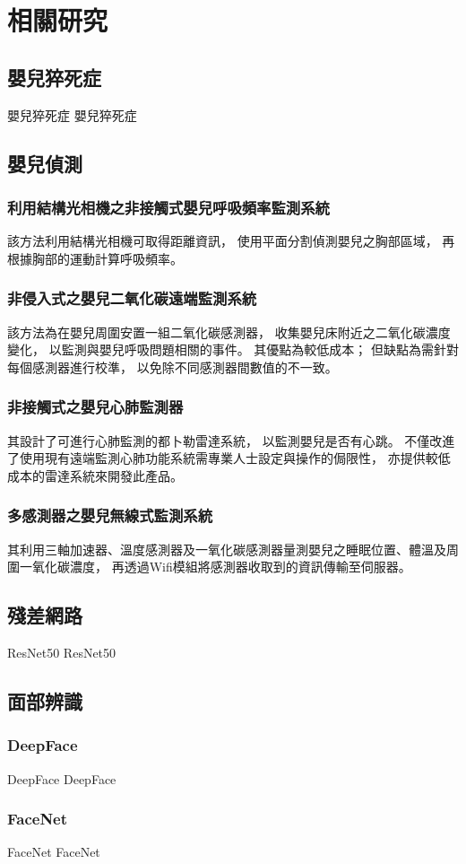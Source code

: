 \documentclass[class=NCU_thesis, crop=false]{standalone}
\begin{document}
\chapter{相關研究}

\section{嬰兒猝死症}
嬰兒猝死症 嬰兒猝死症

\section{嬰兒偵測}
\subsection{利用結構光相機之非接觸式嬰兒呼吸頻率監測系統}
該方法利用結構光相機可取得距離資訊，
使用平面分割偵測嬰兒之胸部區域，
再根據胸部的運動計算呼吸頻率。

\subsection{非侵入式之嬰兒二氧化碳遠端監測系統}
該方法為在嬰兒周圍安置一組二氧化碳感測器，
收集嬰兒床附近之二氧化碳濃度變化，
以監測與嬰兒呼吸問題相關的事件。
其優點為較低成本；
但缺點為需針對每個感測器進行校準，
以免除不同感測器間數值的不一致。

\subsection{非接觸式之嬰兒心肺監測器}
其設計了可進行心肺監測的都卜勒雷達系統，
以監測嬰兒是否有心跳。
不僅改進了使用現有遠端監測心肺功能系統需專業人士設定與操作的侷限性，
亦提供較低成本的雷達系統來開發此產品。

\subsection{多感測器之嬰兒無線式監測系統}
其利用三軸加速器、溫度感測器及一氧化碳感測器量測嬰兒之睡眠位置、體溫及周圍一氧化碳濃度，
再透過Wifi模組將感測器收取到的資訊傳輸至伺服器。

\section{殘差網路}
ResNet50 ResNet50

\section{面部辨識}
\subsection{DeepFace}
DeepFace DeepFace

\subsection{FaceNet}
FaceNet FaceNet
\end{document}
